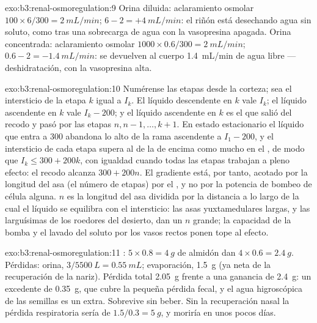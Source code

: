 \begin{solution}{exo:b3:renal-osmoregulation:9}
Orina diluida: aclaramiento osmolar $100\times 6/300 = \qty{2}{mL/min}$;
 $6 - 2 = +\qty{4}{mL/min}$: el riñón está
desechando agua sin soluto, como tras una sobrecarga de agua con la
vasopresina apagada. Orina concentrada: aclaramiento osmolar $1000\times 0.6/300 =
\qty{2}{mL/min}$;  $0.6 - 2 = -\qty{1.4}{mL/min}$:
se devuelven al cuerpo \qty{1.4}{mL/min} de agua libre
---deshidratación, con la vasopresina alta.
\end{solution}

\begin{solution}{exo:b3:renal-osmoregulation:10}
Numérense las etapas desde la corteza; sea el intersticio de la etapa
$k$ igual a $I_{k}$. El líquido descendente en $k$ vale $I_{k}$; el líquido
ascendente en $k$ vale $I_{k} - 200$; y el líquido ascendente en $k$ es
el que salió del recodo y pasó por las etapas $n, n-1, \dots, k+1$. En
estado estacionario el líquido que entra a \qty{300}{} abandona lo alto
de la rama ascendente a $I_{1} - 200$, y el intersticio de cada etapa
supera al de la de encima como mucho en el , de modo que
$I_{k} \le 300 + 200k$, con igualdad cuando todas las etapas trabajan a
pleno efecto: el recodo alcanza $300 + 200n$. El gradiente está, por
tanto, acotado por la longitud del asa (el número de etapas) por el
, y no por la potencia de bombeo de célula alguna. $n$ es
la longitud del asa dividida por la distancia a lo largo de la cual el
líquido se equilibra con el intersticio: las asas yuxtamedulares
largas, y las larguísimas de los roedores del desierto, dan un $n$
grande; la capacidad de la bomba y el lavado del soluto por los vasos
rectos ponen tope al efecto.
\end{solution}

\begin{solution}{exo:b3:renal-osmoregulation:11}
: $5\times 0.8 = \qty{4}{g}$ de almidón dan $4\times 0.6
= \qty{2.4}{g}$. Pérdidas: orina, $3/5500\ \unit{L} = \qty{0.55}{mL}$;
evaporación, \qty{1.5}{g} (ya neta de la recuperación de la nariz).
Pérdida total \qty{2.05}{g} frente a una ganancia de \qty{2.4}{g}: un
excedente de \qty{0.35}{g}, que cubre la pequeña pérdida fecal, y el
agua higroscópica de las semillas es un extra. Sobrevive sin beber. Sin
la recuperación nasal la pérdida respiratoria sería de
$1.5/0.3 = \qty{5}{g}$, y moriría en unos pocos días.
\end{solution}


